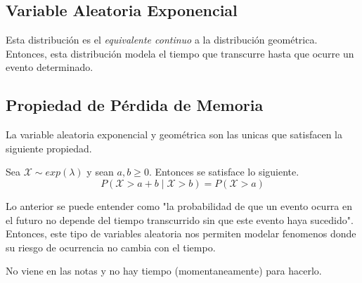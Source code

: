 \subsection{Variable Aleatoria Exponencial}
Esta distribución es el \textit{equivalente continuo} a la distribución geométrica. Entonces, esta distribución modela el tiempo que transcurre hasta que ocurre un evento determinado.


\subsection{Propiedad de Pérdida de Memoria}

La variable aleatoria exponencial y geométrica son las unicas que satisfacen la siguiente propiedad.

Sea $\mathcal X \sim exp(\lambda)$ y sean $a,b \ge 0$. Entonces se satisface lo siguiente.
\[P(\mathcal X > a + b \mid \mathcal X > b) = P(\mathcal X > a)\]

Lo anterior se puede entender como "la probabilidad de que un evento ocurra en el futuro no depende del tiempo transcurrido sin que este evento haya sucedido". Entonces, este tipo de variables aleatoria nos permiten modelar fenomenos donde su riesgo de ocurrencia no cambia con el tiempo.



\begin{myproof}
  No viene en las notas y no hay tiempo (momentaneamente) para hacerlo.
\end{myproof}

